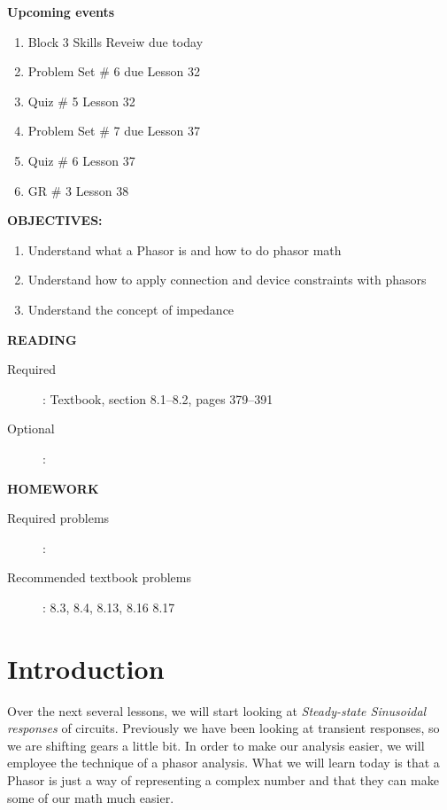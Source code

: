\documentclass{handout}
\begin{document}
\maketitle

\textbf{Upcoming events}
\begin{enumerate}
\item Block 3 Skills Reveiw due today
\item Problem Set \# 6 due Lesson 32
\item Quiz \# 5 Lesson 32
\item Problem Set \# 7 due Lesson 37
\item Quiz \# 6 Lesson 37
\item GR \# 3 Lesson 38
\end{enumerate}

\textbf{OBJECTIVES:}
\begin{enumerate}
\item Understand what a Phasor is and how to do phasor math
\item Understand how to apply connection and device constraints with phasors
\item Understand the concept of impedance
\end{enumerate}

\textbf{READING}
\begin{description}
\item [Required]:
Textbook, section 8.1--8.2, pages 379--391
\item [Optional]: 
\end{description}

\textbf{HOMEWORK}
\begin{description}
\item [Required problems]: 
\item [Recommended textbook problems]: 8.3, 8.4, 8.13, 8.16 8.17
\end{description}

\section{Introduction}
Over the next several lessons, we will start looking at {\em Steady-state Sinusoidal responses} of circuits.  Previously we have been looking at transient responses, so we are shifting gears a little bit.  In order to make our analysis easier, we will employee the technique of a phasor analysis.  What we will learn today is that a Phasor is just a way of representing a complex number and that they can make some of our math much easier.
\end{document}
